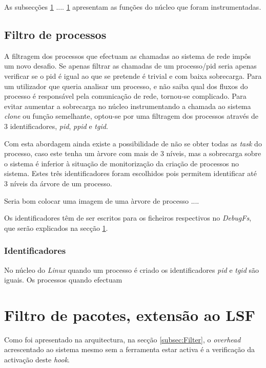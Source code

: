 As subsecções \ref{} .... \ref{} apresentam as funções do núcleo que foram instrumentadas.

%
%

\subsection{Filtro de processos}
A filtragem dos processos que efectuam as chamadas ao sistema de rede impôs um novo desafio.
 Se apenas filtrar as chamadas de um processo/pid seria apenas verificar se o pid é igual ao que se pretende é trivial e com baixa sobrecarga.
 Para um utilizador que queria analisar um processo, e não saiba qual dos fluxos do processo é responsável pela comunicação de rede, tornou-se complicado.
 Para evitar aumentar a sobrecarga no núcleo instrumentando a chamada ao sistema \textit{clone} ou função semelhante, optou-se por uma filtragem dos processos através de 3 identificadores, \textit{pid}, \textit{ppid} e \textit{tgid}.

Com esta abordagem ainda existe a possibilidade de não se obter todas as \textit{task} do processo, caso este tenha um àrvore com mais de 3 níveis, mas a sobrecarga sobre o sistema é inferior à situação de monitorização da criação de processos no sistema.
 Estes três identificadores foram escolhidos pois permitem identificar até 3 níveis da árvore de um processo.

Seria bom colocar uma imagem de uma àrvore de processo .... 

Os identificadores têm de ser escritos para os ficheiros respectivos no \textit{DebugFs}, que serão explicados na secção \ref{}.



\subsubsection{Identificadores}

No núcleo do \textit{Linux} quando um processo é criado os identificadores \textit{pid} e \textit{tgid} são iguais.
Os processos quando efectuam



\section{Filtro de pacotes, extensão ao LSF}

Como foi apresentado na arquitectura, na secção \ref{subsec:Filter}, o \textit{overhead} acrescentado ao sistema mesmo sem a ferramenta estar activa é
a verificação da activação deste \textit{hook}.

